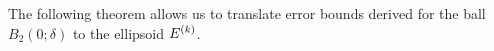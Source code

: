 \documentclass{article}
\begin{document}
% 
% 
% 
% 
% 
% 
% 
% 
% 
% 
% 
% 
% 

The following theorem allows us to translate error bounds derived for the ball $B_2(0;\delta)$ to the ellipsoid ${E^{(k)}}$.


\end{document}
